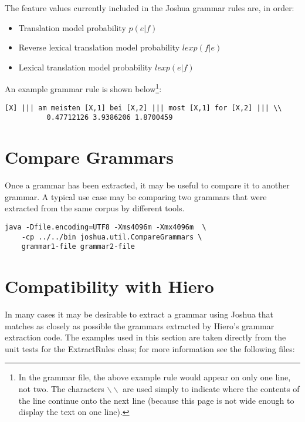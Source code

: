 The feature values currently included in the Joshua grammar rules are, in order:

  \begin{itemize}
  \item Translation model probability $p(e|f)$
  \item Reverse lexical translation model probability $lex p(f|e)$
  \item Lexical translation model probability $lex p(e|f)$
  \end{itemize}

An example grammar rule is shown below\footnote{In the grammar file, the above example rule would appear on only one line, not two. The characters $\backslash\backslash$ are used simply to indicate where the contents of the line continue onto the next line (because this page is not wide enough to display the text on one line).}:

\begin{verbatim}
[X] ||| am meisten [X,1] bei [X,2] ||| most [X,1] for [X,2] ||| \\
          0.47712126 3.9386206 1.8700459
\end{verbatim}






\section{Compare Grammars}

Once a grammar has been extracted, it may be useful to compare it to another grammar. A typical use case may be comparing two grammars that were extracted from the same corpus by different tools.

\begin{verbatim}
java -Dfile.encoding=UTF8 -Xms4096m -Xmx4096m  \
    -cp ../../bin joshua.util.CompareGrammars \
    grammar1-file grammar2-file
\end{verbatim}


\section{Compatibility with Hiero}

In many cases it may be desirable to extract a grammar using Joshua that matches as closely as possible the grammars extracted by Hiero's grammar extraction code. The examples used in this section are taken directly from the unit tests for the ExtractRules class; for more information see the following files:

